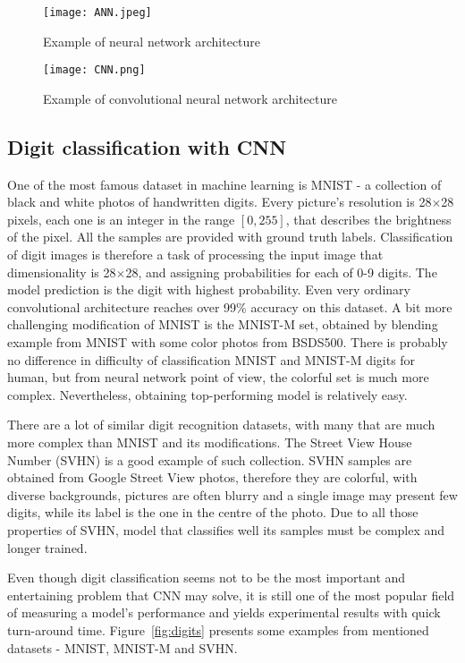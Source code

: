\documentclass{article}
\begin{document}
\begin{figure}[htb]%
    \centering
    \texttt{[image: ANN.jpeg]}%
    \caption{Example of neural network architecture}%
    \label{fig:ANN}%
\end{figure}
\begin{figure}[htb]%
    \centering
    \texttt{[image: CNN.png]}%
    \caption{Example of convolutional neural network architecture}%
    \label{fig:CNN}%
\end{figure}

\subsection{Digit classification with CNN}
One of the most famous dataset in machine learning is MNIST - a collection of black and white photos of handwritten digits. Every picture's resolution is 28$\times$28 pixels, each one is an integer in the range $[0,255]$, that describes the brightness of the pixel. All the samples are provided with ground truth labels. Classification of digit images is therefore a task of processing the input image that dimensionality is 28$\times$28, and assigning probabilities for each of 0-9 digits. The model prediction is the digit with highest probability. Even very ordinary convolutional architecture reaches over 99\% accuracy on this dataset. A bit more challenging modification of MNIST is the MNIST-M set, obtained by blending example from MNIST with some color photos from BSDS500. There is probably no difference in difficulty of classification MNIST and MNIST-M digits for human, but from neural network point of view, the colorful set is much more complex. Nevertheless, obtaining top-performing model is relatively easy.
\par
There are a lot of similar digit recognition datasets, with many that are much more complex than MNIST and its modifications. The Street View House Number (SVHN) is a good example of such collection. SVHN samples are obtained from Google Street View photos, therefore they are colorful, with diverse backgrounds, pictures are often blurry and a single image may present few digits, while its label is the one in the centre of the photo. Due to all those properties of SVHN, model that classifies well its samples must be complex and longer trained. 
\par
Even though digit classification seems not to be the most important and entertaining problem that CNN may solve, it is still one of the most popular field of measuring a model's performance and yields experimental results with quick turn-around time. Figure~\ref{fig:digits} presents some examples from mentioned datasets - MNIST, MNIST-M and SVHN.
\end{document}
